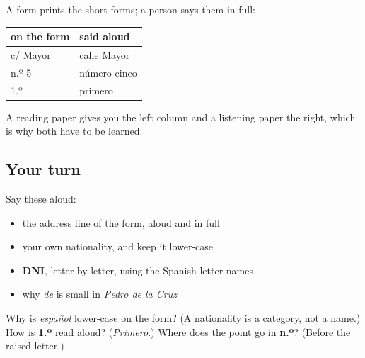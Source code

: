 \begin{grammarlens}[title={Grammar Lens: the same data spoken aloud}]
A form prints the short forms; a person says them in full:

\noindent
\begin{tabularx}{\linewidth}{@{}>{\raggedright\arraybackslash}X>{\raggedright\arraybackslash}X@{}}
\toprule
\textbf{on the form} & \textbf{said aloud} \\
\midrule
c/ Mayor & calle Mayor \\
n.º 5 & número cinco \\
1.º & primero \\
\bottomrule
\end{tabularx}

A reading paper gives you the left column and a listening paper the right, which is why both have to be learned.
\end{grammarlens}

\subsection*{Your turn}
Say these aloud:

\begin{itemize}
\raggedright
  \item the address line of the form, aloud and in full
  \item your own nationality, and keep it lower-case
  \item \textbf{DNI}, letter by letter, using the Spanish letter names
  \item why \emph{de} is small in \emph{Pedro de la Cruz}
\end{itemize}

\begin{tcolorbox}[breakable,colback=teal!4,colframe=teal!35!black,title={Before you move on}]
Why is \emph{español} lower-case on the form? (A nationality is a category, not a name.) How is \textbf{1.º} read aloud? (\emph{Primero}.) Where does the point go in \textbf{n.º}? (Before the raised letter.)
\end{tcolorbox}
